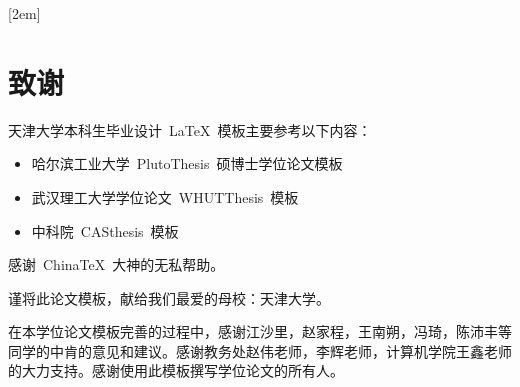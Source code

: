 [2em]{\vspace{.5\baselineskip}\xiaosan\song}%
             {\prechaptername\CJKnumber{\thecontentslabel}\postchaptername\qquad}{} %
             {}             %
\lhead{}
\rhead{}
\lfoot{}
\cfoot{}
\rfoot{}
\chapter*{致\quad 谢}
\setcounter{page}{1}

天津大学本科生毕业设计~\LaTeX~模板主要参考以下内容：
\begin{itemize}
  \item 哈尔滨工业大学~PlutoThesis~硕博士学位论文模板
  \item 武汉理工大学学位论文~WHUTThesis~模板
  \item 中科院~CASthesis~模板
\end{itemize}

感谢~ChinaTeX~大神的无私帮助。

谨将此论文模板，献给我们最爱的母校：天津大学。

在本学位论文模板完善的过程中，感谢江沙里，赵家程，王南朔，冯琦，陈沛丰等同学的中肯的意见和建议。感谢教务处赵伟老师，李辉老师，计算机学院王鑫老师的大力支持。感谢使用此模板撰写学位论文的所有人。

